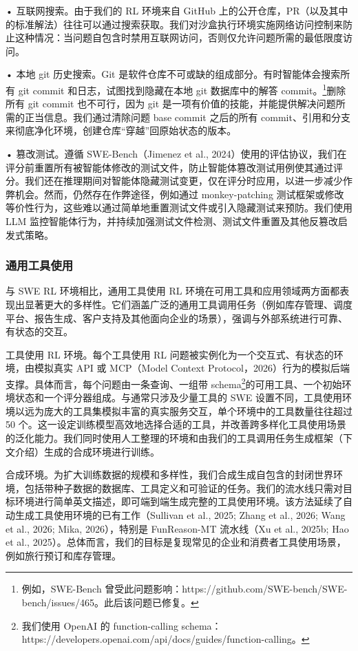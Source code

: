 \documentclass[
  10
]{article}
\begin{document}
• 互联网搜索。由于我们的 RL 环境来自 GitHub 上的公开仓库，PR（以及其中的标准解法）往往可以通过搜索获取。我们对沙盒执行环境实施网络访问控制来防止这种情况：当问题自包含时禁用互联网访问，否则仅允许问题所需的最低限度访问。

• 本地 git 历史搜索。Git 是软件仓库不可或缺的组成部分。有时智能体会搜索所有 git commit 和日志，试图找到隐藏在本地 git 数据库中的解答 commit。\footnote{例如，SWE-Bench 曾受此问题影响：https://github.com/SWE-bench/SWE-bench/issues/465。此后该问题已修复。}删除所有 git commit 也不可行，因为 git 是一项有价值的技能，并能提供解决问题所需的正当信息。我们通过清除问题 base commit 之后的所有 commit、引用和分支来彻底净化环境，创建仓库“穿越”回原始状态的版本。

• 篡改测试。遵循 SWE-Bench（Jimenez et al., 2024）使用的评估协议，我们在评分前重置所有被智能体修改的测试文件，防止智能体篡改测试用例使其通过评分。我们还在推理期间对智能体隐藏测试变更，仅在评分时应用，以进一步减少作弊机会。然而，仍然存在作弊途径，例如通过 monkey-patching 测试框架或修改等价性行为，这些难以通过简单地重置测试文件或引入隐藏测试来预防。我们使用 LLM 监控智能体行为，并持续加强测试文件检测、测试文件重置及其他反篡改启发式策略。

\subsubsection{通用工具使用}\label{general-tool-use}

与 SWE RL 环境相比，通用工具使用 RL 环境在可用工具和应用领域两方面都表现出显著更大的多样性。它们涵盖广泛的通用工具调用任务（例如库存管理、调度平台、报告生成、客户支持及其他面向企业的场景），强调与外部系统进行可靠、有状态的交互。

工具使用 RL 环境。每个工具使用 RL 问题被实例化为一个交互式、有状态的环境，由模拟真实 API 或 MCP（Model Context Protocol，2026）行为的模拟后端支撑。具体而言，每个问题由一条查询、一组带 schema\footnote{我们使用 OpenAI 的 function-calling schema：https://developers.openai.com/api/docs/guides/function-calling。}的可用工具、一个初始环境状态和一个评分器组成。与通常只涉及少量工具的 SWE 设置不同，工具使用环境以远为庞大的工具集模拟丰富的真实服务交互，单个环境中的工具数量往往超过 50 个。这一设定训练模型高效地选择合适的工具，并改善跨多样化工具使用场景的泛化能力。我们同时使用人工整理的环境和由我们的工具调用任务生成框架（下文介绍）生成的合成环境进行训练。

合成环境。为扩大训练数据的规模和多样性，我们合成生成自包含的封闭世界环境，包括带种子数据的数据库、工具定义和可验证的任务。我们的流水线只需对目标环境进行简单英文描述，即可端到端生成完整的工具使用环境。该方法延续了自动生成工具使用环境的已有工作（Sullivan et al., 2025; Zhang et al., 2026; Wang et al., 2026; Mika, 2026），特别是 FunReason-MT 流水线（Xu et al., 2025b; Hao et al., 2025）。总体而言，我们的目标是复现常见的企业和消费者工具使用场景，例如旅行预订和库存管理。
\end{document}
